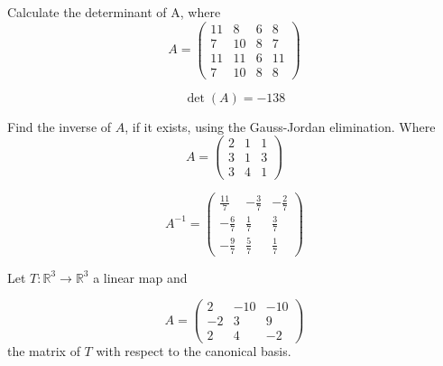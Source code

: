 \begin{questions}

\question Calculate the determinant of A, where
$$
A=\left(\begin{array}{rrrr}
11 & 8 & 6 & 8 \\
7 & 10 & 8 & 7 \\
11 & 11 & 6 & 11 \\
7 & 10 & 8 & 8
\end{array}\right)
$$

\begin{solution}
$$\det(A)=-138$$
\end{solution}

\question Find the inverse of $A$, if it exists, using the Gauss-Jordan elimination. Where
$$
A=\left(\begin{array}{rrr}
2 & 1 & 1 \\
3 & 1 & 3 \\
3 & 4 & 1
\end{array}\right)
$$

\begin{solution}
$$A^{-1}=\left(\begin{array}{rrr}
\frac{11}{7} & -\frac{3}{7} & -\frac{2}{7} \\
-\frac{6}{7} & \frac{1}{7} & \frac{3}{7} \\
-\frac{9}{7} & \frac{5}{7} & \frac{1}{7}
\end{array}\right)$$
\end{solution}

\question Let $T:\mathbb{R}^3\rightarrow\mathbb{R}^3$  a linear map and
 
$$
A=\left(\begin{array}{rrr}
2 & -10 & -10 \\
-2 & 3 & 9 \\
2 & 4 & -2
\end{array}\right)
$$
the matrix of $T$ with respect to the canonical basis.
\end{questions}

